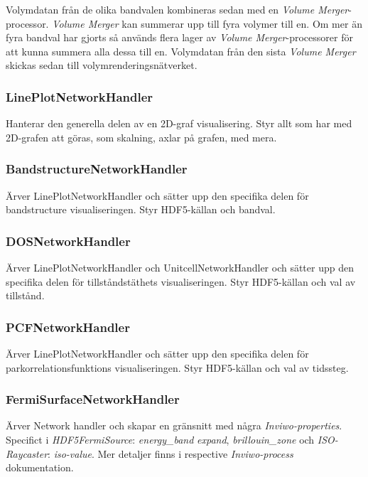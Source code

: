 \documentclass[10pt,oneside,swedish]{article}
\begin{document}
Volymdatan från de olika bandvalen kombineras sedan med en \emph{Volume
Merger}-processor. \emph{Volume Merger} kan summerar upp till fyra
volymer till en. Om mer än fyra bandval har gjorts så används flera
lager av \emph{Volume Merger}-processorer för att kunna summera alla
dessa till en. Volymdatan från den sista \emph{Volume Merger} skickas
sedan till volymrenderingsnätverket.

\subsubsection{LinePlotNetworkHandler}\label{lineplotnetworkhandler}

Hanterar den generella delen av en 2D-graf visualisering. Styr allt som
har med 2D-grafen att göras, som skalning, axlar på grafen, med mera.

\subsubsection{BandstructureNetworkHandler}\label{bandstructurenetworkhandler}

Ärver LinePlotNetworkHandler och sätter upp den specifika delen för
bandstructure visualiseringen. Styr HDF5-källan och bandval.

\subsubsection{DOSNetworkHandler}\label{dosnetworkhandler}

Ärver LinePlotNetworkHandler och UnitcellNetworkHandler och sätter upp
den specifika delen för tillståndstäthets visualiseringen. Styr
HDF5-källan och val av tillstånd.

\subsubsection{PCFNetworkHandler}\label{pcfnetworkhandler}

Ärver LinePlotNetworkHandler och sätter upp den specifika delen för
parkorrelationsfunktions visualiseringen. Styr HDF5-källan och val av
tidssteg.

\subsubsection{FermiSurfaceNetworkHandler}\label{fermisurfacenetworkhandler}

Ärver Network handler och skapar en gränsnitt med några
\emph{Inviwo-properties}. Specifict i \emph{HDF5FermiSource}:
\emph{energy\_band} \emph{expand}, \emph{brillouin\_zone} och
\emph{ISO-Raycaster}: \emph{iso-value}. Mer detaljer finns i respective
\emph{Inviwo-process} dokumentation.
\end{document}

